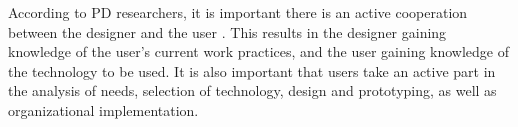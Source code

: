 According to PD researchers, it is important there is an active cooperation between the designer and the user \cite{kensing_participatory_1998}. This results in the designer gaining knowledge of the user's current work practices, and the user gaining knowledge of the technology to be used. It is also important that users take an active part in the analysis of needs, selection of technology, design and prototyping, as well as organizational implementation.